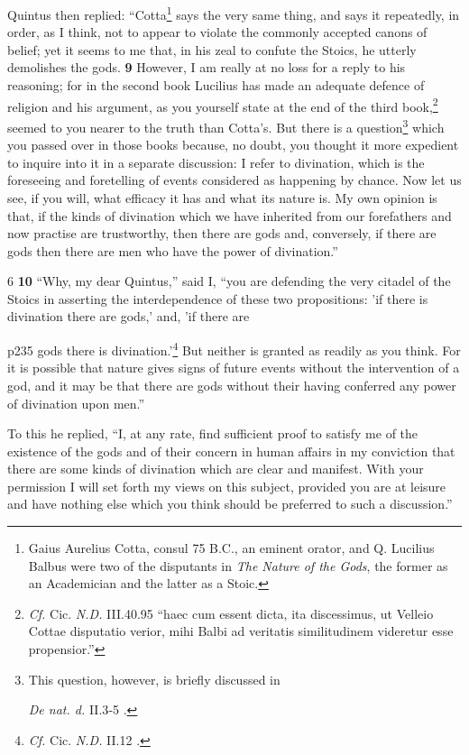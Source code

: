 Quintus then replied: ``Cotta\texthebrew{}\footnote{Gaius Aurelius Cotta, consul 75 B.C., an eminent orator, and Q. Lucilius Balbus were two of the disputants in \emph{The Nature of the Gods}, the former as an Academician and the latter as a Stoic.

} says the very same thing, and says it repeatedly, in order, as I think, not to appear to violate the commonly accepted canons of belief; yet it seems to me that, in his zeal to confute the Stoics, he utterly demolishes the gods. \textbf{9} However, I am really at no loss for a reply to his reasoning; for in the second book Lucilius has made an adequate defence of religion and his argument, as you yourself state at the end of the third book,\texthebrew{}\footnote{\emph{Cf.} Cic. \emph{N.D.} III.40.95
``haec cum essent dicta, ita discessimus, ut Velleio Cottae disputatio verior, mihi Balbi ad veritatis similitudinem videretur esse propensior.''

} seemed to you nearer to the truth than Cotta's. But there is a question\texthebrew{}\footnote{This question, however, is briefly discussed in

\emph{De nat. d.} II.3\texthebrew{‑}5 .

} which you passed over in those books because, no doubt, you thought it more expedient to inquire into it in a separate discussion: I refer to divination, which is the foreseeing and foretelling of events considered as happening by chance. Now let us see, if you will, what efficacy it has and what its nature is. My own opinion is that, if the kinds of divination which we have inherited from our forefathers and now practise are trustworthy, then there are gods and, conversely, if there are gods then there are men who have the power of divination.''

6
\textbf{10} ``Why, my dear Quintus,'' said I, ``you are defending the very citadel of the Stoics in asserting the interdependence of these two propositions: 'if there is divination there are gods,' and, 'if there are

p235 gods there is divination.'\texthebrew{}\footnote{\emph{Cf.} Cic. \emph{N.D.} II.12 .

} But neither is granted as readily as you think. For it is possible that nature gives signs of future events without the intervention of a god, and it may be that there are gods without their having conferred any power of divination upon men.''

To this he replied, ``I, at any rate, find sufficient proof to satisfy me of the existence of the gods and of their concern in human affairs in my conviction that there are some kinds of divination which are clear and manifest. With your permission I will set forth my views on this subject, provided you are at leisure and have nothing else which you think should be preferred to such a discussion.''

